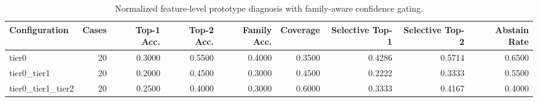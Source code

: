 \begin{table}[t]
\centering
\caption{Normalized feature-level prototype diagnosis with family-aware confidence gating.}
\label{tab:dice_stressor_hierarchical_diagnosis}
\footnotesize
\begin{tabular}{lrrrrrrrr}
\toprule
Configuration & Cases & Top-1 Acc. & Top-2 Acc. & Family Acc. & Coverage & Selective Top-1 & Selective Top-2 & Abstain Rate \\
\midrule
tier0 & 20 & 0.3000 & 0.5500 & 0.4000 & 0.3500 & 0.4286 & 0.5714 & 0.6500 \\
tier0_tier1 & 20 & 0.2000 & 0.4500 & 0.3000 & 0.4500 & 0.2222 & 0.3333 & 0.5500 \\
tier0_tier1_tier2 & 20 & 0.2500 & 0.4000 & 0.3000 & 0.6000 & 0.3333 & 0.4167 & 0.4000 \\
\bottomrule
\end{tabular}

\end{table}
